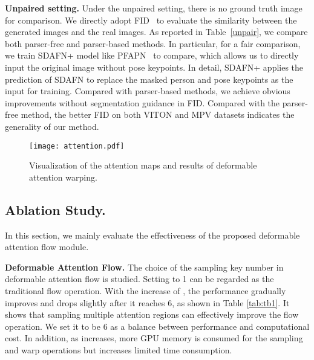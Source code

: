 \documentclass[runningheads]{llncs}
\begin{document}
\textbf{Unpaired setting.} Under the unpaired setting, there is no ground truth image for comparison. We directly adopt FID~\cite{heusel2017gans} to evaluate the similarity between the generated images and the real images. As reported in Table~\ref{unpair}, we compare both parser-free and parser-based methods. In particular, for a fair comparison, we train SDAFN+ model like PFAPN~\cite{ge2021parser} to compare, which allows us to directly input the original image without pose keypoints. In detail, SDAFN+ applies the prediction of SDAFN to replace the masked person and pose keypoints as the input for training. Compared with parser-based methods, we achieve obvious
improvements without segmentation guidance in FID. Compared with the parser-free method, the better FID on both VITON and MPV datasets indicates the generality of our method.


\begin{figure}[t]
\centering
\texttt{[image: attention.pdf]}
   \caption{Visualization of the attention maps and results of deformable attention warping. \label{att}}

\end{figure}


\subsection{Ablation Study.}
In this section, we mainly evaluate the effectiveness of the proposed deformable attention flow module.

\textbf{Deformable Attention Flow.} 
The choice of the sampling key number  in deformable attention flow is studied. Setting  to 1 can be regarded as the traditional flow operation. With the increase of , the performance gradually improves and drops slightly after it reaches 6, as shown in Table \ref{tab:tb1}. It shows that sampling multiple attention regions can effectively improve the flow operation. We set it to be 6 as a balance between performance and computational cost. In addition, as  increases, more GPU memory is consumed for the sampling and warp operations but increases limited time consumption.
\end{document}
